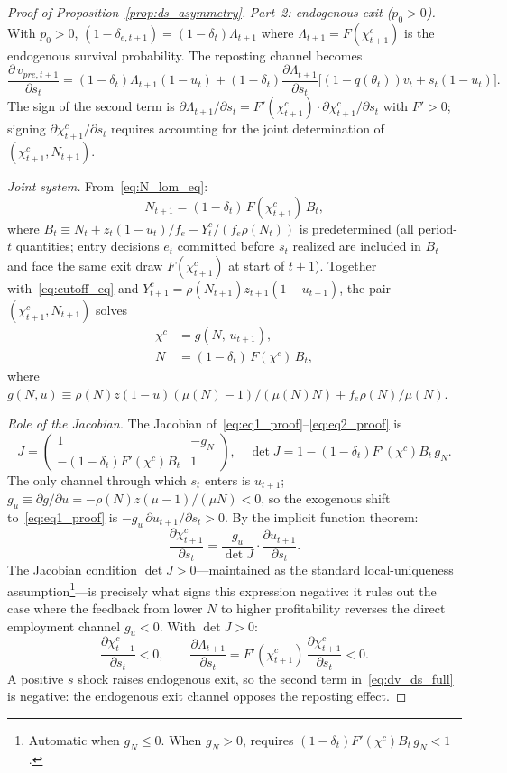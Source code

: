 \documentclass[authoryear, review, 12pt]{elsarticle}
\begin{document}
\begin{proof}[Proof of Proposition~\ref{prop:ds_asymmetry}]
\medskip
\emph{Part~2: endogenous exit ($p_0>0$).}
With $p_0>0$, $(1-\delta_{e,t+1})=(1-\delta_t)\Lambda_{t+1}$
where $\Lambda_{t+1}=F(\chi^c_{t+1})$ is the endogenous survival
probability.
The reposting channel becomes
\[
	\frac{\partial\,v_{pre,t+1}}{\partial s_t}
	= (1-\delta_t)\Lambda_{t+1}(1-u_t)
	  + (1-\delta_t)\frac{\partial\Lambda_{t+1}}{\partial s_t}
	  \bigl[(1-q(\theta_t))v_t+s_t(1-u_t)\bigr].
\]
The sign of the second term is $\partial\Lambda_{t+1}/\partial s_t
= F'(\chi^c_{t+1})\cdot\partial\chi^c_{t+1}/\partial s_t$ with
$F'>0$; signing $\partial\chi^c_{t+1}/\partial s_t$ requires
accounting for the joint determination of $(\chi^c_{t+1},N_{t+1})$.

\medskip\noindent\emph{Joint system.}
From~\eqref{eq:N_lom_eq}:
\[
	N_{t+1} = (1-\delta_t)\,F(\chi^c_{t+1})\,B_t,
\]
where $B_t \equiv N_t + z_t(1-u_t)/f_e - Y^c_t/(f_e\rho(N_t))$
is predetermined (all period-$t$ quantities; entry decisions $e_t$
committed before $s_t$ realized are included in $B_t$ and face the
same exit draw $F(\chi^c_{t+1})$ at start of $t+1$).
Together with~\eqref{eq:cutoff_eq} and
$Y^c_{t+1}=\rho(N_{t+1})z_{t+1}(1-u_{t+1})$, the pair
$(\chi^c_{t+1},N_{t+1})$ solves
\begin{align}
	\chi^c &= g(N,\,u_{t+1}), \label{eq:eq1_proof}\\
	N      &= (1-\delta_t)\,F(\chi^c)\,B_t,\label{eq:eq2_proof}
\end{align}
where $g(N,u)\equiv\rho(N)z(1-u)(\mu(N)-1)/(\mu(N)N)+f_e\rho(N)/\mu(N)$.

\medskip\noindent\emph{Role of the Jacobian.}
The Jacobian of~\eqref{eq:eq1_proof}--\eqref{eq:eq2_proof} is
\[
	J = \begin{pmatrix}1 & -g_N \\
	    -(1-\delta_t)F'(\chi^c)B_t & 1\end{pmatrix},
	\quad
	\det J = 1-(1-\delta_t)F'(\chi^c)B_t\,g_N.
\]
The only channel through which $s_t$ enters is $u_{t+1}$;
$g_u\equiv\partial g/\partial u=-\rho(N)z(\mu-1)/(\mu N)<0$,
so the exogenous shift to~\eqref{eq:eq1_proof} is
$-g_u\,\partial u_{t+1}/\partial s_t>0$.
By the implicit function theorem:
\[
	\frac{\partial\chi^c_{t+1}}{\partial s_t}
	= \frac{g_u}{\det J}\cdot\frac{\partial u_{t+1}}{\partial s_t}.
\]
The Jacobian condition $\det J>0$---maintained as the standard
local-uniqueness assumption\footnote{Automatic when $g_N\leq 0$.
When $g_N>0$, requires $(1-\delta_t)F'(\chi^c)B_t\,g_N<1$.}---is
precisely what signs this expression negative: it rules out the
case where the feedback from lower $N$ to higher profitability
reverses the direct employment channel $g_u<0$.
With $\det J>0$:
\[
	\frac{\partial\chi^c_{t+1}}{\partial s_t}<0,
	\qquad
	\frac{\partial\Lambda_{t+1}}{\partial s_t}
	= F'(\chi^c_{t+1})\,\frac{\partial\chi^c_{t+1}}{\partial s_t}<0.
\]
A positive $s$ shock raises endogenous exit, so the second term
in~\eqref{eq:dv_ds_full} is negative: the endogenous exit channel
opposes the reposting effect.


\end{proof}
\end{document}
